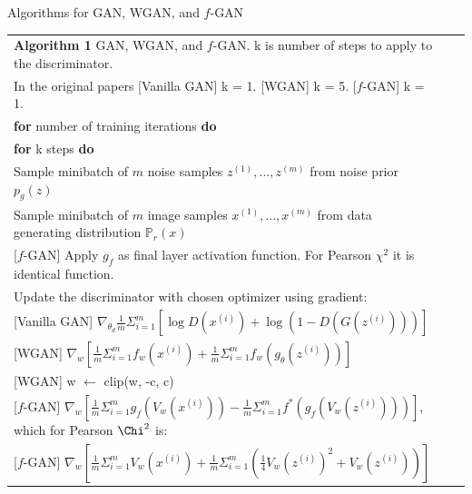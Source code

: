 \documentclass[final]{beamer}
\newlength{\colwidth}
\begin{document}
\begin{frame}[t]
\begin{columns}[t]
\begin{column}{\colwidth}
\begin{block}{Algorithms for GAN, WGAN, and $f$-GAN}
\begin{table}[t]
  \centering
  \begin{tabular}{lcr}
   {\bf Algorithm 1} GAN, WGAN, and $f$-GAN. k is number of steps to apply to the discriminator. \\
   In the original papers {\color{green} [Vanilla GAN] k = 1.}  {\color{blue} [WGAN] k = 5.}  {\color{red} [$f$-GAN] k = 1.}\\ \hline
   {\bf for} number of training iterations {\bf do}\\
   \hspace{4mm} {\bf for} k steps {\bf do}\\
   \hspace{8mm} Sample minibatch of $m$ noise samples ${z^{(1)}, ..., z^{(m)}}$ from noise prior $p_g(z)$\\
   \hspace{8mm} Sample minibatch of $m$ image samples ${x^{(1)}, ..., x^{(m)}}$ from data generating distribution $\mathbb{P}_r(x)$\\
   \hspace{8mm} {\color{red} [$f$-GAN] Apply $g_f$ as final layer activation function. For Pearson $\chi^2$ it is identical function.} \\   
   \hspace{8mm} Update the discriminator with chosen optimizer using gradient: \\
   \hspace{16mm} {\color{green} [Vanilla GAN] $\nabla_{\theta_d} \frac{1}{m} \Sigma_{i=1}^m [\log D(x^{(i)}) + \log (1 - D(G(z^{(i)})))]$} \\
   \hspace{16mm} {\color{blue}[WGAN] $\nabla_{w} [\frac{1}{m} \Sigma_{i=1}^m f_w(x^{(i)}) + \frac{1}{m} \Sigma_{i=1}^m  f_w(g_\theta(z^{(i)}))]$} \\
   \hspace{16mm} {\color{blue} [WGAN] w $\xleftarrow{}$ clip(w, -c, c)}\\
   \hspace{16mm} {\color{red} [$f$-GAN] $\nabla_{w} [\frac{1}{m} \Sigma_{i=1}^m g_f(V_w(x^{(i)})) - \frac{1}{m} \Sigma_{i=1}^m f^*(g_f(V_w(z^{(i)})))]$, which for Pearson $\Chi^2$ is:}\\
   \hspace{16mm} {\color{red} [$f$-GAN] $\nabla_{w} [\frac{1}{m} \Sigma_{i=1}^m V_w(x^{(i)}) + \frac{1}{m} \Sigma_{i=1}^m \left( \frac{1}{4} V_w(z^{(i)})^2 + V_w(z^{(i)})\right)]$}\\



\end{tabular}
\end{table}
\end{block}
\end{column}
\end{columns}
\end{frame}
\end{document}
